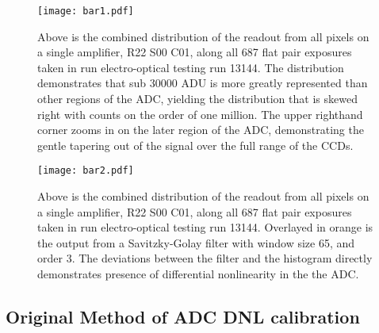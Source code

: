 \documentclass[11pt, letterpaper]{article}
\begin{document}
\begin{figure}
	\texttt{[image: bar1.pdf]}
	\caption{Above is the combined distribution of the readout from all pixels on a single amplifier, R22 S00 C01, along all 687 flat pair exposures taken in run electro-optical testing 			run 13144. The distribution demonstrates that sub 30000 ADU is more greatly represented than other regions of the ADC, yielding the distribution that is skewed right with 			counts on the order of one million. The upper righthand corner zooms in on the later region of the ADC, demonstrating the gentle tapering out of the signal over the full range 			of the CCDs.}
\end{figure}

\begin{figure}
	\texttt{[image: bar2.pdf]}
	\caption{Above is the combined distribution of the readout from all pixels on a single amplifier, R22 S00 C01, along all 687 flat pair exposures taken in run electro-optical testing 			run 13144. Overlayed in orange is the output from a Savitzky-Golay filter with window size 65, and order 3. The deviations between the filter and the histogram directly 				demonstrates presence of differential nonlinearity in the the ADC.}
\end{figure}


\subsection{Original Method of ADC DNL calibration}
\indent
\end{document}
